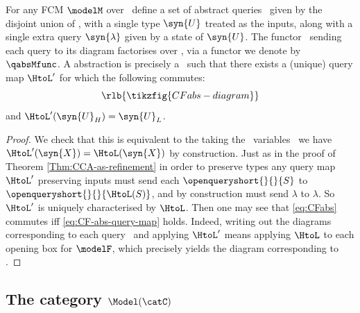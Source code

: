 \documentclass{article}
\begin{document}
{\begin{lemma} \label{lem:CF-characterisation}
 For any FCM $\modelM$ over \ define a set of abstract queries \ given by the disjoint union of , with a single type $\syn{U}$ treated as the inputs, along with a single extra query $\syn{\lambda}$ given by a state of $\syn{U}$. The functor \rlb{$\qabsMfunc \colon \absLthree(\syn{\FMCVen}) \to \strucS$}\ sending each query to its diagram factorises over , via a functor we denote by $\qabsMfunc$. 
A \CF{} abstraction is precisely a \qdown{} 
\  
such that there exists a (unique) query map $\HtoL'$ for which the following commutes: 
\begin{equation} \label{eq:CFabs}
\rlb{\tikzfig{CFabs-diagram}}
\end{equation}
and $\HtoL'(\syn{U}_H) = \syn{U}_L$. 
\end{lemma}
\begin{proof} 
We check that this is equivalent to the \qdown{} taking the \rlc{form \eqref{eq:CF-abs-query-map}. 
On}\ variables \rlb{$\syn{X} \in \FMCVen_H$}\ we have $\HtoL'(\syn{X}) = \HtoL(\syn{X})$ by construction. Just as in the proof of Theorem \ref{Thm:CCA-as-refinement} in order to preserve types any query map $\HtoL'$ preserving inputs must send each $\openqueryshort{}{}{S}$ to $\openqueryshort{}{}{\HtoL(S)}$, and by construction must send $\lambda$ to $\lambda$. So $\HtoL'$ is uniquely characterised by $\HtoL$. Then one may see that \eqref{eq:CFabs} commutes iff \eqref{eq:CF-abs-query-map} holds. Indeed, writing out the diagrams corresponding to each query \ and applying $\HtoL'$ means applying $\HtoL$ to each opening box for $\modelF$, which precisely yields the diagram corresponding to .
\end{proof}



\subsection{The category $\Model(\catC)$}

}
\end{document}
